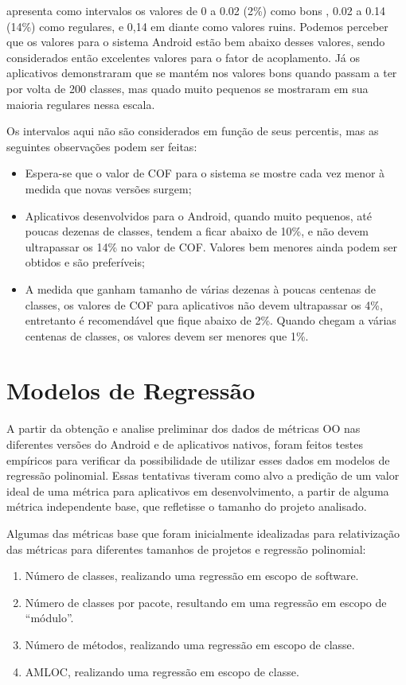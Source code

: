  apresenta como intervalos os valores de 0 a 0.02 (2\%) como bons , 0.02 a 0.14 (14\%) como regulares, e 0,14 em diante como valores ruins. Podemos perceber que os valores para o sistema Android estão bem abaixo desses valores, sendo considerados então excelentes valores para o fator de acoplamento. Já os aplicativos demonstraram que se mantém nos valores bons quando passam a ter por volta de 200 classes, mas quado muito pequenos se mostraram em sua maioria regulares nessa escala. 

Os intervalos aqui não são considerados em função de seus percentis, mas as seguintes observações podem ser feitas:

\begin{itemize}
\item Espera-se que o valor de COF para o sistema se mostre cada vez menor à medida que novas versões surgem;
\item Aplicativos desenvolvidos para o Android, quando muito pequenos, até poucas dezenas de classes, tendem a ficar abaixo de 10\%, e não devem ultrapassar os 14\% no valor de COF. Valores bem menores ainda podem ser obtidos e são preferíveis;
\item A medida que ganham tamanho de várias dezenas à poucas centenas de classes, os valores de COF para aplicativos não devem ultrapassar os 4\%, entretanto é recomendável que fique abaixo de 2\%. Quando chegam a várias centenas de classes, os valores devem ser menores que 1\%.
\end{itemize}

\section{Modelos de Regressão}

A partir da obtenção e analise preliminar dos dados de métricas OO nas diferentes versões do Android e de aplicativos nativos, foram feitos testes empíricos para verificar da possibilidade de utilizar esses dados em modelos de regressão polinomial. Essas tentativas tiveram como alvo a predição de um valor ideal de uma métrica para aplicativos em desenvolvimento, a partir de alguma métrica independente base, que refletisse o tamanho do projeto analisado. 

Algumas das métricas base que foram inicialmente idealizadas para relativização das métricas para diferentes tamanhos de projetos e regressão polinomial:

\begin{enumerate}
\item Número de classes, realizando uma regressão em escopo de software.
\item Número de classes por pacote, resultando em uma regressão em escopo de ``módulo''.
\item Número de métodos, realizando uma regressão em escopo de classe.
\item AMLOC, realizando uma regressão em escopo de classe.
\end{enumerate}

